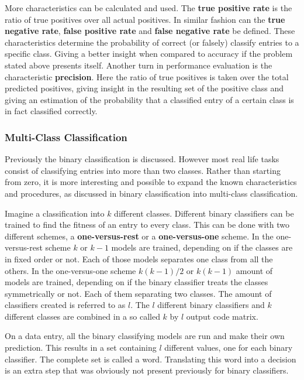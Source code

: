 More characteristics can be calculated and used.
The \textbf{true positive rate} is the ratio of true positives over all actual positives. 
In similar fashion can the \textbf{true negative rate}, \textbf{false positive rate} and \textbf{false negative rate} be defined.
These characteristics determine the probability of correct (or falsely) classify entries to a specific class.
Giving a better insight when compared to accuracy if the problem stated above presents itself.
Another turn in performance evaluation is the characteristic \textbf{precision}.
Here the ratio of true positives is taken over the total predicted positives, giving insight in the resulting set of the positive class and giving an estimation of the probability that a classified entry of a certain class is in fact classified correctly.

\subsubsection{Multi-Class Classification}
Previously the binary classification is discussed. 
However most real life tasks consist of classifying entries into more than two classes.
Rather than starting from zero, it is more interesting and possible to expand the known characteristics and procedures, as discussed in binary classification into multi-class classification.
\par 
Imagine a classification into $k$ different classes. 
Different binary classifiers can be trained to find the fitness of an entry to every class.
This can be done with two different schemes, a \textbf{one-versus-rest} or a \textbf{one-versus-one} scheme.
In the one-versus-rest scheme $k$ or $k-1$ models are trained, depending on if the classes are in fixed order or not.
Each of those models separates one class from all the others.
In the one-versus-one scheme $k(k-1)/2$ or $k(k-1)$ amount of models are trained, depending on if the binary classifier treats the classes symmetrically or not. 
Each of them separating two classes.
The amount of classifiers created is referred to as $l$.
The $l$ different binary classifiers and $k$ different classes are combined in a so called $k$ by $l$ output code matrix. 
\par 
On a data entry, all the binary classifying models are run and make their own prediction.
This results in a set containing $l$ different values, one for each binary classifier.
The complete set is called a word. 
Translating this word into a decision is an extra step that was obviously not present previously for binary classifiers.

